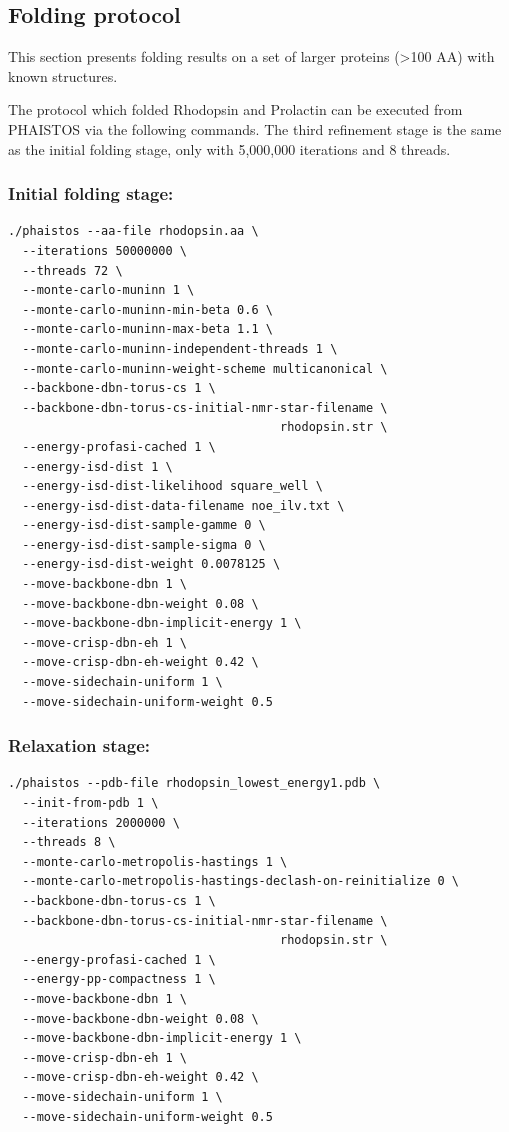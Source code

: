 \subsection{Folding protocol}
This section presents folding results on a set of larger proteins (\textgreater 100 AA) with known structures.

The protocol which folded Rhodopsin and Prolactin can be executed from PHAISTOS via the following commands. The third refinement stage is the same as the initial folding stage, only with 5,000,000 iterations and 8 threads.

\subsubsection{Initial folding stage:}
\begin{lstlisting}
./phaistos --aa-file rhodopsin.aa \
  --iterations 50000000 \
  --threads 72 \
  --monte-carlo-muninn 1 \
  --monte-carlo-muninn-min-beta 0.6 \
  --monte-carlo-muninn-max-beta 1.1 \
  --monte-carlo-muninn-independent-threads 1 \
  --monte-carlo-muninn-weight-scheme multicanonical \
  --backbone-dbn-torus-cs 1 \
  --backbone-dbn-torus-cs-initial-nmr-star-filename \
                                      rhodopsin.str \
  --energy-profasi-cached 1 \
  --energy-isd-dist 1 \
  --energy-isd-dist-likelihood square_well \
  --energy-isd-dist-data-filename noe_ilv.txt \
  --energy-isd-dist-sample-gamme 0 \
  --energy-isd-dist-sample-sigma 0 \
  --energy-isd-dist-weight 0.0078125 \
  --move-backbone-dbn 1 \
  --move-backbone-dbn-weight 0.08 \
  --move-backbone-dbn-implicit-energy 1 \
  --move-crisp-dbn-eh 1 \
  --move-crisp-dbn-eh-weight 0.42 \
  --move-sidechain-uniform 1 \
  --move-sidechain-uniform-weight 0.5
\end{lstlisting}

\subsubsection{Relaxation stage:}
\begin{lstlisting}
./phaistos --pdb-file rhodopsin_lowest_energy1.pdb \
  --init-from-pdb 1 \
  --iterations 2000000 \
  --threads 8 \
  --monte-carlo-metropolis-hastings 1 \
  --monte-carlo-metropolis-hastings-declash-on-reinitialize 0 \
  --backbone-dbn-torus-cs 1 \
  --backbone-dbn-torus-cs-initial-nmr-star-filename \
                                      rhodopsin.str \
  --energy-profasi-cached 1 \
  --energy-pp-compactness 1 \
  --move-backbone-dbn 1 \
  --move-backbone-dbn-weight 0.08 \
  --move-backbone-dbn-implicit-energy 1 \
  --move-crisp-dbn-eh 1 \
  --move-crisp-dbn-eh-weight 0.42 \
  --move-sidechain-uniform 1 \
  --move-sidechain-uniform-weight 0.5
\end{lstlisting}


